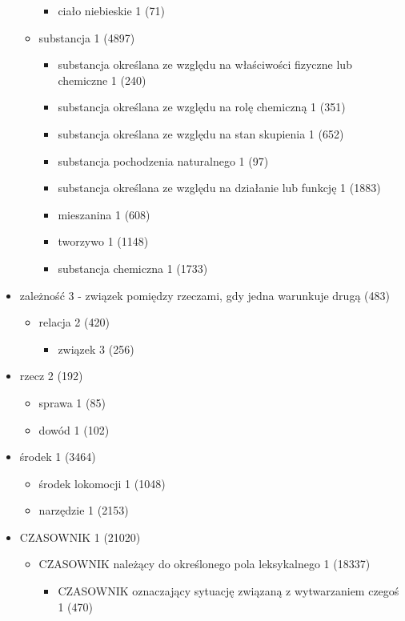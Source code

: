 \documentclass[a4paper,12pt]{article}
\begin{document}
\begin{itemize}
\begin{itemize}
\begin{itemize}
    \item ciało niebieskie 1  (71)
    \end{itemize}
  \item substancja 1  (4897)
    \begin{itemize}
    \item substancja określana ze względu na właściwości fizyczne lub chemiczne 1  (240)
    \item substancja określana ze względu na rolę chemiczną 1  (351)
    \item substancja określana ze względu na stan skupienia 1  (652)
    \item substancja pochodzenia naturalnego 1  (97)
    \item substancja określana ze względu na działanie lub funkcję 1  (1883)
    \item  mieszanina 1 (608)
    \item tworzywo 1  (1148)
    \item substancja chemiczna 1  (1733)
    \end{itemize}
  \end{itemize}
\item zależność 3 - związek pomiędzy rzeczami, gdy jedna warunkuje drugą (483)
  \begin{itemize}
  \item relacja 2  (420)
    \begin{itemize}
    \item związek 3 (256)
    \end{itemize}
  \end{itemize}
\item rzecz 2  (192)
  \begin{itemize}
  \item sprawa 1  (85)
  \item dowód 1  (102)
  \end{itemize}
\item środek 1  (3464)
  \begin{itemize}
  \item środek lokomocji 1  (1048)
  \item narzędzie 1  (2153)
  \end{itemize}
\item CZASOWNIK 1  (21020)
  \begin{itemize}
  \item CZASOWNIK należący do określonego pola leksykalnego 1  (18337)
    \begin{itemize}
    \item CZASOWNIK oznaczający sytuację związaną z wytwarzaniem czegoś 1  (470)

\end{itemize}
\end{itemize}
\end{itemize}
\end{document}
